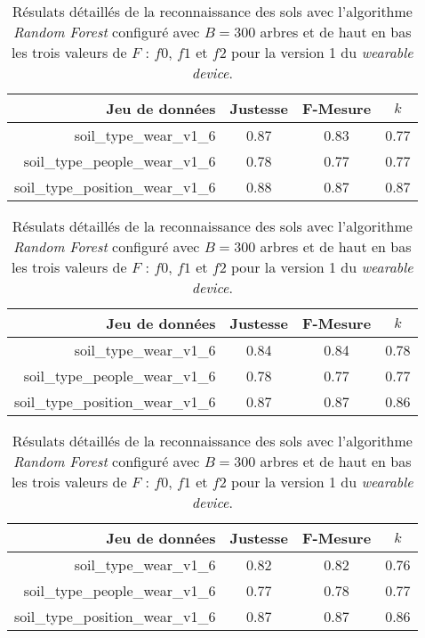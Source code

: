 \begin{table}[H]\renewcommand{\arraystretch}{0.5}
	\centering
	\caption{Résulats détaillés de la reconnaissance des sols avec l'algorithme \textit{Random Forest} configuré avec $B=300$ arbres et de haut en bas les trois valeurs de $F$ : $f0$, $f1$ et $f2$ pour la version 1 du \textit{wearable device}.}
	\label{tab:rf-300-wear-v1}
	\begin{tabular}{@{}rccc@{}}
		\toprule
			\textbf{Jeu de données} & \textbf{Justesse} & \textbf{F-Mesure} & \textbf{$k$} \\
		\midrule
			soil\_type\_wear\_v1\_6 & 0.87 & 0.83 & 0.77 \\
			soil\_type\_people\_wear\_v1\_6 & 0.78 & 0.77 & 0.77 \\
			soil\_type\_position\_wear\_v1\_6 & 0.88 & 0.87 & 0.87 \\
	\end{tabular}
	\begin{tabular}{@{}rccc@{}}
		\toprule
			\textbf{Jeu de données} & \textbf{Justesse} & \textbf{F-Mesure} & \textbf{$k$} \\
		\midrule
			soil\_type\_wear\_v1\_6 & 0.84 & 0.84 & 0.78 \\
			soil\_type\_people\_wear\_v1\_6 & 0.78 & 0.77 & 0.77 \\
			soil\_type\_position\_wear\_v1\_6 & 0.87 & 0.87 & 0.86 \\
	\end{tabular}
	\begin{tabular}{@{}rccc@{}}
		\toprule
			\textbf{Jeu de données} & \textbf{Justesse} & \textbf{F-Mesure} & \textbf{$k$} \\
		\midrule
			soil\_type\_wear\_v1\_6 & 0.82 & 0.82 & 0.76 \\
			soil\_type\_people\_wear\_v1\_6 & 0.77 & 0.78 & 0.77 \\
			soil\_type\_position\_wear\_v1\_6 & 0.87 & 0.87 & 0.86 \\
		\bottomrule
	\end{tabular}
\end{table}

